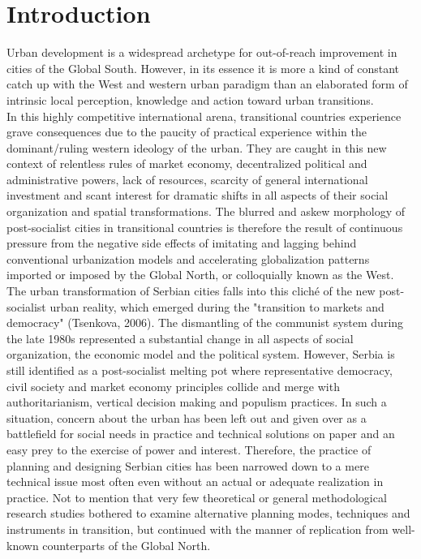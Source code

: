 \documentclass[11pt]{report}
\begin{document}

\chapter{Introduction}

Urban development is a widespread archetype for out-of-reach improvement in cities of the Global South. However, in its essence it is more a kind of constant catch up with the West and western urban paradigm than an elaborated form of intrinsic local perception, knowledge and action toward urban transitions. 
\\
In this highly competitive international arena, transitional countries experience grave consequences due to the paucity of practical experience within the dominant/ruling western ideology of the urban. They are caught in this new context of relentless rules of market economy, decentralized political and administrative powers, lack of resources, scarcity of general international investment and scant interest for dramatic shifts in all aspects of their social organization and spatial transformations. The blurred and askew morphology of post-socialist cities in transitional countries is therefore the result of continuous pressure from the negative side effects of imitating and lagging behind conventional urbanization models and accelerating globalization patterns imported or imposed by the Global North, or colloquially known as the West.
\\
The urban transformation of Serbian cities falls into this cliché of the new post-socialist urban reality, which emerged during the "transition to markets and democracy" (Tsenkova, 2006). The dismantling of the communist system during the late 1980s represented a substantial change in all aspects of social organization, the economic model and the political system. However, Serbia is still identified as a post-socialist melting pot where representative democracy, civil society and market economy principles collide and merge with authoritarianism, vertical decision making and populism practices. In such a situation, concern about the urban has been left out and given over as a battlefield for social needs in practice and technical solutions on paper and an easy prey to the exercise of power and interest. Therefore, the practice of planning and designing Serbian cities has been narrowed down to a mere technical issue most often even without an actual or adequate realization in practice. Not to mention that very few theoretical or general methodological research studies bothered to examine alternative planning modes, techniques and instruments in transition, but continued with the manner of replication from well-known counterparts of the Global North.
\end{document}
